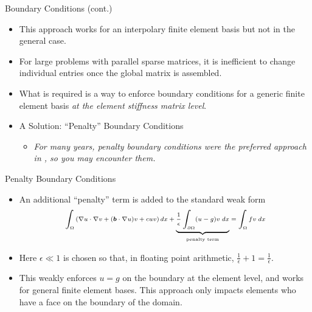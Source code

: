 \begin{frame}{Boundary Conditions (cont.)}
  \begin{itemize}
    \item This approach works for an interpolary finite element basis
      but not in the general case.

    \item For large problems with parallel sparse matrices, it
      is inefficient to change individual entries once the global matrix is assembled.

    \item What is required is a way to enforce boundary conditions for
      a generic finite element basis \emph{at the element stiffness matrix level}.

    \item A Solution: ``Penalty'' Boundary Conditions
      \begin{itemize}
      \item \emph{For many years, penalty boundary conditions were the preferred approach in \libMesh{}, so you may encounter them.}
      \end{itemize}
  \end{itemize}
\end{frame}


\begin{frame}{Penalty Boundary Conditions}
  \begin{itemize}
  \item An additional ``penalty'' term is added to the standard weak form
    \begin{equation}
      \nonumber
      \scriptsize
      \int_{\Omega} \left( \nabla u \cdot \nabla v + ({\boldsymbol{b}} \cdot \nabla u) v + cuv \right) dx
      + \underbrace{\frac{1}{\epsilon} \int_{\partial \Omega} (u-g)v \; dx}_{\text{penalty term}} =
      \int_{\Omega} fv \; dx
    \end{equation}

  \item Here $\epsilon \ll 1$ is chosen so that, in floating point arithmetic,
    $\frac{1}{\epsilon} + 1 = \frac{1}{\epsilon}$.

  \item This weakly enforces $u=g$ on the boundary at the element level, and works for
    general finite element bases.  This approach only impacts elements who have a face 
    on the boundary of the domain.
  \end{itemize}
\end{frame}





